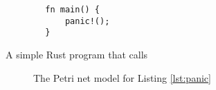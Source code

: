 \begin{listing}[!htb]
    \begin{verbatim}
        fn main() {
            panic!();
        }        
    \end{verbatim}
    \caption{A simple Rust program that calls }
    \label{lst:panic}
\end{listing}

\begin{figure}[!htb]
    \centering
    
    \caption{The Petri net model for Listing \ref{lst:panic}}
    \label{fig:panic}
\end{figure}
